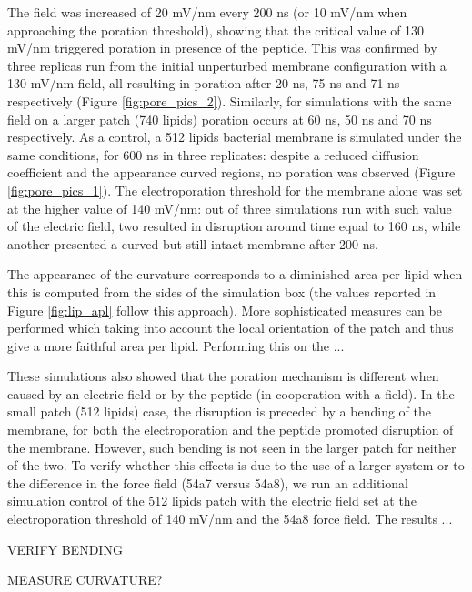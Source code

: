The field was increased of 20 mV/nm every 200 ns (or 10 mV/nm when approaching the poration threshold), showing that the critical value of 130 mV/nm triggered poration in presence of the peptide. This was confirmed by three replicas run from the initial unperturbed membrane configuration with a 130 mV/nm field, all resulting in poration after 20 ns, 75 ns and 71 ns respectively (Figure \ref{fig:pore_pics_2}).
%
Similarly, for simulations with the same field on a larger patch (740 lipids) poration occurs at 60 ns, 50 ns and 70 ns respectively.
%
As a control, a 512 lipids bacterial membrane is simulated under the same conditions, for 600 ns in three replicates: despite a reduced diffusion coefficient and the appearance curved regions, no poration was observed (Figure \ref{fig:pore_pics_1}). The electroporation threshold for the membrane alone was set at the higher value of 140 mV/nm: out of three simulations run with such value of the electric field, two resulted in disruption around time equal to 160 ns, while another presented a curved but still intact membrane after 200 ns.

The appearance of the curvature corresponds to a diminished area per lipid when this is computed from the sides of the simulation box (the values reported in Figure \ref{fig:lip_apl} follow this approach).
%
More sophisticated measures can be performed which taking into account the local orientation of the patch and thus give a more faithful area per lipid. Performing this on the ...

These simulations also showed that the poration mechanism is different when caused by an electric field or by the peptide (in cooperation with a field).
%
In the small patch (512 lipids) case, the disruption is preceded by a bending of the membrane, for both the electroporation and the peptide promoted disruption of the membrane. However, such bending is not seen in the larger patch for neither of the two. To verify whether this effects is due to the use of a larger system or to the difference in the force field (54a7 versus 54a8), we run an additional simulation control of the 512 lipids patch with the electric field set at the electroporation threshold of 140 mV/nm and the 54a8 force field. The results ...


VERIFY BENDING

MEASURE CURVATURE?

